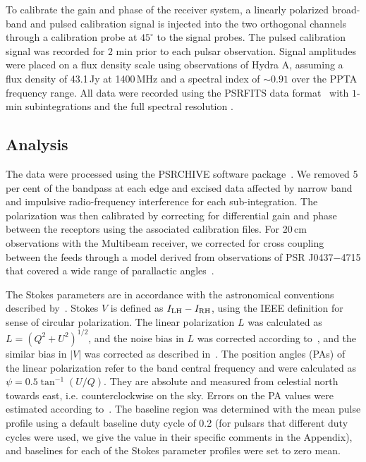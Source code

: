 \documentclass[useAMS,usenatbib]{mn2e}
\begin{document}
To calibrate the gain and phase of the receiver system, a linearly polarized 
broad-band and pulsed calibration signal is injected into the two orthogonal 
channels through a calibration probe at $45^{\circ}$ to the 
signal probes. The pulsed calibration signal was recorded for $2$ min prior to 
each pulsar observation.
%
Signal amplitudes were placed on a flux density scale using observations of 
Hydra A, assuming a flux density of 43.1\,Jy at 1400\,MHz and a spectral 
index of $\sim0.91$ over the PPTA frequency range.
%
All data were recorded using the PSRFITS data format~\citep{Hotan04} with 
$1$-min subintegrations and the full spectral resolution
%
\citep[for futher details see][and references therein]{Manchester13}. 
%

%


\subsection{Analysis}

The data were processed using the PSRCHIVE software package~\citep{Hotan04}. 
We removed 5 per cent of the bandpass at each edge and excised data 
affected by narrow band and impulsive radio-frequency interference for each 
sub-integration.
%
The polarization was then calibrated by correcting for differential gain and 
phase between the receptors using the associated calibration files.
%
For 20\,cm observations with the Multibeam receiver, we corrected for 
cross coupling between the feeds through a model derived from observations of 
PSR J0437$-$4715 that covered a wide range of parallactic angles~\citep{VanStraten04}.
%

The Stokes parameters are in accordance with the astronomical conventions described 
by~\citet{vanStraten10}. Stokes $V$ is defined as $I_{\rm{LH}}-I_{\rm{RH}}$, 
using the IEEE definition for sense of circular polarization. 
%
The linear polarization $L$ was calculated as $L=(Q^2+U^2)^{1/2}$, and the 
noise bias in $L$ was corrected according to~\citet{Lorimer05}, and the similar 
bias in $|V|$ was corrected as described in~\citet{Yan11}.
%
The position angles (PAs) of the linear polarization refer to the band central 
frequency and were calculated as $\psi=0.5\tan^{-1}(U/Q)$. They are absolute and 
measured from celestial north towards east, i.e. counterclockwise on the sky.
%
Errors on the PA values were estimated according to~\citet{Everett01}.
%
The baseline region was determined with the mean pulse profile using a default 
baseline duty cycle of 0.2 (for pulsars that different duty cycles were used, 
we give the value in their specific comments in the Appendix), and baselines for 
each of the Stokes parameter profiles were set to zero mean.
%
\end{document}
